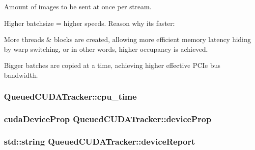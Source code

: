 Amount of images to be sent at once per stream. 

Higher batchsize = higher speeds. Reason why it\textquotesingle{}s faster\+:
\begin{DoxyEnumerate}
\item More threads \& blocks are created, allowing more efficient memory latency hiding by warp switching, or in other words, higher occupancy is achieved.
\item Bigger batches are copied at a time, achieving higher effective P\+C\+Ie bus bandwidth. 
\end{DoxyEnumerate}
\subsubsection[{\texorpdfstring{cpu\+\_\+time}{cpu_time}}]{ Queued\+C\+U\+D\+A\+Tracker\+::cpu\+\_\+time}\hypertarget{class_queued_c_u_d_a_tracker_ae8b2eeef65a2a1acde697df6c206ae08}{}\label{class_queued_c_u_d_a_tracker_ae8b2eeef65a2a1acde697df6c206ae08}
\subsubsection[{\texorpdfstring{device\+Prop}{deviceProp}}]{\setlength{\rightskip}{0pt plus 5cm}cuda\+Device\+Prop Queued\+C\+U\+D\+A\+Tracker\+::device\+Prop\hspace{0.3cm}{\ttfamily [protected]}}\hypertarget{class_queued_c_u_d_a_tracker_a60ba8b15a56739a7a26a538d23b7ec92}{}\label{class_queued_c_u_d_a_tracker_a60ba8b15a56739a7a26a538d23b7ec92}
\subsubsection[{\texorpdfstring{device\+Report}{deviceReport}}]{\setlength{\rightskip}{0pt plus 5cm}std\+::string Queued\+C\+U\+D\+A\+Tracker\+::device\+Report}\hypertarget{class_queued_c_u_d_a_tracker_af28a9fc89bcd9634e81b3fc404809aaf}{}\label{class_queued_c_u_d_a_tracker_af28a9fc89bcd9634e81b3fc404809aaf}
